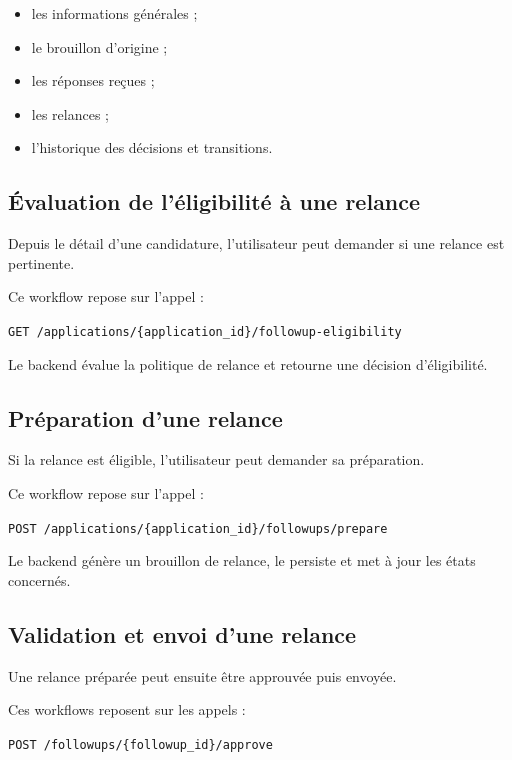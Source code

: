 \documentclass[11pt,a4paper]{article}
\begin{document}
\begin{itemize}
    \item les informations générales ;
    \item le brouillon d’origine ;
    \item les réponses reçues ;
    \item les relances ;
    \item l’historique des décisions et transitions.
\end{itemize}

\subsection{Évaluation de l’éligibilité à une relance}

Depuis le détail d’une candidature, l’utilisateur peut demander si une relance est pertinente.

Ce workflow repose sur l’appel :

\begin{center}
\texttt{GET /applications/\{application\_id\}/followup-eligibility}
\end{center}

Le backend évalue la politique de relance et retourne une décision d’éligibilité.

\subsection{Préparation d’une relance}

Si la relance est éligible, l’utilisateur peut demander sa préparation.

Ce workflow repose sur l’appel :

\begin{center}
\texttt{POST /applications/\{application\_id\}/followups/prepare}
\end{center}

Le backend génère un brouillon de relance, le persiste et met à jour les états concernés.

\subsection{Validation et envoi d’une relance}

Une relance préparée peut ensuite être approuvée puis envoyée.

Ces workflows reposent sur les appels :

\begin{center}
\texttt{POST /followups/\{followup\_id\}/approve}
\end{center}
\end{document}
